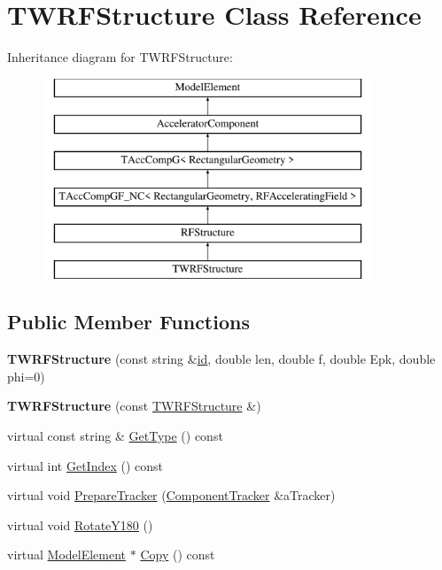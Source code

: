 \hypertarget{classTWRFStructure}{}\section{T\+W\+R\+F\+Structure Class Reference}
\label{classTWRFStructure}
Inheritance diagram for T\+W\+R\+F\+Structure\+:\begin{figure}[H]
\begin{center}
\leavevmode
\includegraphics[height=6.000000cm]{classTWRFStructure}
\end{center}
\end{figure}
\subsection*{Public Member Functions}
\begin{DoxyCompactItemize}
\item 
\mbox{\label{classTWRFStructure_a6463125a53fd669f1644428cd7dfdf9d}} 
{\bfseries T\+W\+R\+F\+Structure} (const string \&\hyperlink{classModelElement_aada171ead2085c75b592cf07d91bc5c2}{id}, double len, double f, double Epk, double phi=0)
\item 
\mbox{\label{classTWRFStructure_ad2f00c1f528ff704f2124e4d4f208031}} 
{\bfseries T\+W\+R\+F\+Structure} (const \hyperlink{classTWRFStructure}{T\+W\+R\+F\+Structure} \&)
\item 
virtual const string \& \hyperlink{classTWRFStructure_ae3eb08e80bfac82a5a1ba43ce367a71f}{Get\+Type} () const
\item 
virtual int \hyperlink{classTWRFStructure_a5a8ac2ad58e94158e840c5d296fbb53c}{Get\+Index} () const
\item 
virtual void \hyperlink{classTWRFStructure_aed3f451bc33edf90177d75c5e53d94af}{Prepare\+Tracker} (\hyperlink{classComponentTracker}{Component\+Tracker} \&a\+Tracker)
\item 
virtual void \hyperlink{classTWRFStructure_a04893d600099a41642de0634013c5091}{Rotate\+Y180} ()
\item 
virtual \hyperlink{classModelElement}{Model\+Element} $\ast$ \hyperlink{classTWRFStructure_a46eda3c195425b6cc0dc6377e08a9df9}{Copy} () const
\end{DoxyCompactItemize}
